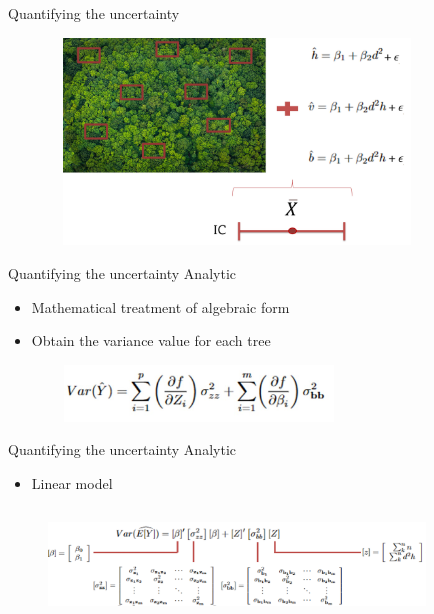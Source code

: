 \documentclass{beamer}
\begin{document}
\begin{frame}{Quantifying the uncertainty}
\begin{figure}
        \centering
        \includegraphics[width = 10cm, height = 5.5cm]{pic/fontes2.jpg}
        \end{figure}          
\end{frame}


\begin{frame}{Quantifying the uncertainty}
Analytic
\begin{itemize}
    \item Mathematical treatment of algebraic form
    \item Obtain the variance value for each tree 
\end{itemize}

\begin{figure}
        \centering
        \includegraphics[width = 8cm, height = 1.5cm]{pic/analitico1.jpg}
        \end{figure}  
    
\end{frame}


\begin{frame}{Quantifying the uncertainty}
Analytic
\begin{itemize}
    \item Linear model
\end{itemize}

\begin{figure}
        \centering
        \includegraphics[width = 10cm, height = 3cm]{pic/analitico.jpg}
        \end{figure}  
    
\end{frame}
\end{document}
